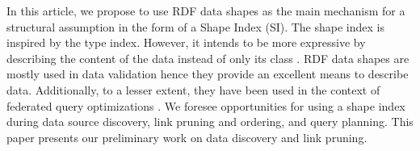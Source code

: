 In this article, we propose to use RDF data shapes as the main mechanism for a structural assumption in the form of a Shape Index (SI).
The shape index is inspired by the type index.
However, it intends to be more expressive by describing the content of the data instead of only its class \cite{Taelman2017}.
RDF data shapes are mostly used in data validation \cite{Gayo2018a} hence they provide an excellent means to describe data.
Additionally, to a lesser extent, they have been used in the context of federated query optimizations \cite{kashif2021}.
We foresee opportunities for using a shape index during data source discovery, link pruning and ordering, and query planning.
This paper presents our preliminary work on data discovery and link pruning.
